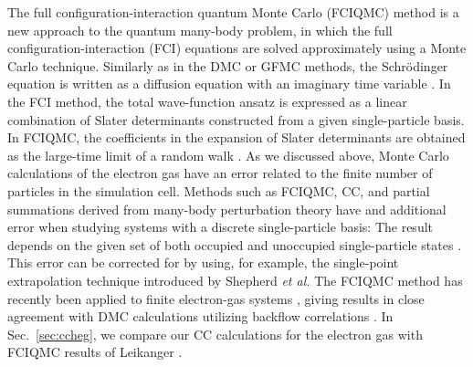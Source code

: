 \documentclass[a4paper,12pt]{report}
\begin{document}
The full configuration-interaction quantum Monte Carlo 
(FCIQMC) met\-hod \cite{booth2009} is a new approach to the 
quantum many-body problem, in which the full 
configuration-interaction (FCI) equations \cite{harris} are 
solved approximately using a Monte Carlo technique. Similarly 
as in the DMC or GFMC methods, the Schr{\"o}dinger equation is 
written as a diffusion equation with an imaginary time 
variable \cite{shepherd_2012a}. In the FCI method, the total 
wave-function ansatz 
is expressed as a linear combination of Slater determinants 
constructed from a given single-particle basis. In FCIQMC, 
the coefficients in the expansion of Slater determinants 
are obtained as the large-time limit of a random walk 
\cite{shepherd_2012a}. As we discussed above, Monte Carlo
calculations of the electron gas have an error related to 
the finite number of particles in the simulation cell. 
Methods such as FCIQMC, CC, and partial summations derived 
from many-body perturbation theory have and additional error 
when studying systems with a discrete single-particle basis: 
The result depends on the given set of both occupied and 
unoccupied single-particle states \cite{shepherd_2012b}. 
This error can be corrected for by using, for example, the 
single-point extrapolation technique \cite{shepherd_2012b,
shepherd_2012c} introduced by Shepherd \emph{et al.} The 
FCIQMC method has recently been applied to finite 
electron-gas systems \cite{shepherd_2012a,shepherd_2012b,
shepherd_2012c}, giving results in close agreement
with DMC calculations utilizing backflow correlations 
\cite{shepherd_2012a}. In Sec.~\ref{sec:ccheg},
we compare our CC calculations for the electron gas with 
FCIQMC results of Leikanger \cite{leikanger_pc}. 
\end{document}

